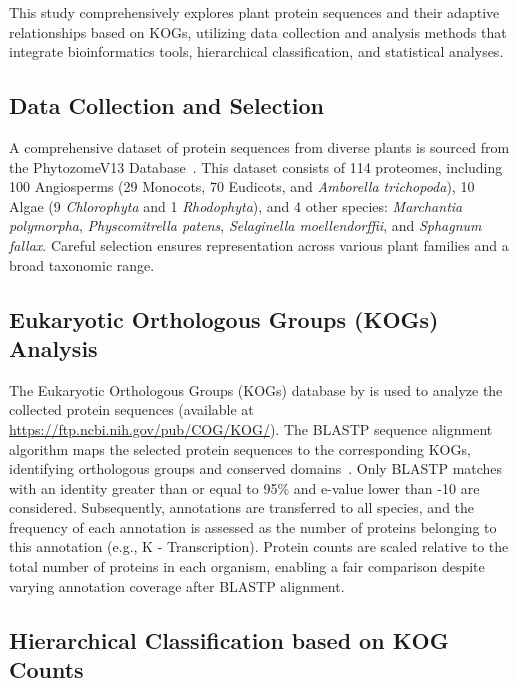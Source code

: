 This study comprehensively explores plant protein sequences and 
their adaptive relationships based on KOGs, utilizing data 
collection and analysis methods that integrate bioinformatics 
tools, hierarchical classification, and statistical analyses.


\subsection{Data Collection and Selection}
\label{sec:method.data}

A comprehensive dataset of protein sequences from diverse plants 
is sourced from the PhytozomeV13 Database~\citep{goodstein2011}.
This dataset consists of 114 proteomes, including 100 
Angiosperms (29 Monocots, 70 Eudicots, and \emph{Amborella 
trichopoda}), 10 Algae (9 \emph{Chlorophyta} and 1 
\emph{Rhodophyta}), and 4 other species: \emph{Marchantia 
polymorpha}, \emph{Physcomitrella patens}, \emph{Selaginella 
moellendorffii}, and \emph{Sphagnum fallax}. Careful selection 
ensures representation across various plant families and a 
broad taxonomic range.


\subsection{Eukaryotic Orthologous Groups (KOGs) Analysis}
\label{sec:method.kog}

The Eukaryotic Orthologous Groups (KOGs) database 
by \cite{tatusov2003} is used to analyze the collected protein 
sequences (available at
\url{https://ftp.ncbi.nih.gov/pub/COG/KOG/}). 
The BLASTP sequence alignment algorithm maps the 
selected protein sequences to the corresponding KOGs, 
identifying orthologous groups and conserved 
domains~\citep{camacho2009}. Only BLASTP matches with an 
identity greater than or equal to 95\% and e-value lower 
than -10 are considered.
Subsequently, annotations are transferred to all species, 
and the frequency of each annotation is assessed as the 
number of proteins belonging to this annotation (e.g., K - 
Transcription). Protein counts are scaled relative to the 
total number of proteins in each organism, enabling a 
fair comparison despite varying annotation coverage after 
BLASTP alignment.


\subsection{Hierarchical Classification based on KOG Counts}
\label{sec:method.hierarchy}


